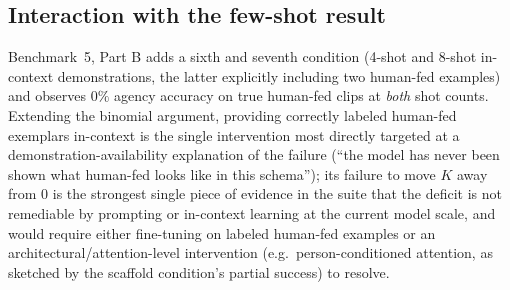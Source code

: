 \subsection{Interaction with the few-shot result}

Benchmark~5, Part B adds a sixth and seventh condition (4-shot and 8-shot
in-context demonstrations, the latter explicitly including two human-fed
examples) and observes $0\%$ agency accuracy on true human-fed clips at
\emph{both} shot counts. Extending the binomial argument, providing
correctly labeled human-fed exemplars in-context is the single
intervention most directly targeted at a demonstration-availability
explanation of the failure (``the model has never been shown what
human-fed looks like in this schema''); its failure to move $K$ away from
$0$ is the strongest single piece of evidence in the suite that the
deficit is not remediable by prompting or in-context learning at the
current model scale, and would require either fine-tuning on labeled
human-fed examples or an architectural/attention-level intervention (e.g.\
person-conditioned attention, as sketched by the scaffold condition's
partial success) to resolve.
